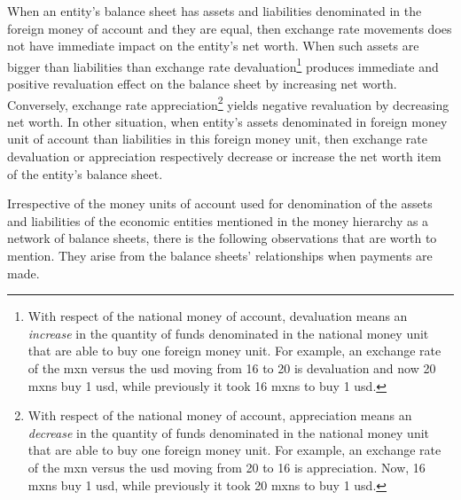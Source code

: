 When an entity's balance sheet has assets and liabilities denominated in
the foreign money of account and they are equal, then exchange rate
movements does not have immediate impact on the entity's net worth. When
such assets are bigger than liabilities than exchange rate
devaluation\footnote{With respect of the national money of account, devaluation
    means an \textit{increase} in the quantity of funds denominated in the
    national money unit that are able to buy one foreign money unit. For
    example, an exchange rate of the \acf{mxn} versus the \acf{usd} moving from 16 to 20 is devaluation and now 20 \acfp{mxn} buy 1 \acf{usd}, while previously it took 16 \acfp{mxn} to
    buy 1 \acf{usd}.} produces immediate and positive revaluation effect on
the balance sheet by increasing net worth. Conversely, exchange rate
appreciation\footnote{With respect of the national money of account, appreciation
    means an \textit{decrease} in the quantity of funds denominated in the
    national money unit that are able to buy one foreign money unit. For
    example, an exchange rate of the \acf{mxn} versus the \acf{usd} moving from 20 to 16 is appreciation. Now, 16 \acfp{mxn} buy 1 \acf{usd}, while previously it took 20 \acfp{mxn} to
    buy 1 \acf{usd}.} yields negative revaluation by decreasing net worth.
In other situation, when entity's assets denominated in foreign money
unit of account than liabilities in this foreign money unit, then
exchange rate devaluation or appreciation respectively decrease or
increase the net worth item of the entity's balance sheet.

Irrespective of the money units of account used for denomination of the
assets and liabilities of the economic entities mentioned in the money
hierarchy as a network of balance sheets, there is the following
observations that are worth to mention. They arise from the balance
sheets' relationships when payments are made.


